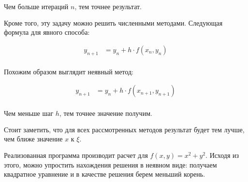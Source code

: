 \documentclass[a4paper,12pt]{article}
\begin{document}
Чем больше итераций $n$, тем точнее результат.

Кроме того, эту задачу можно решить численными методами. Следующая формула
для явного способа:

\[
\begin{aligned}
y_{n+1} &= y_n + h \cdot f(x_n, y_n) \\
\end{aligned}
\]

Похожим образом выглядит неявный метод:

\[
\begin{aligned}
y_{n+1} &= y_n + h \cdot f(x_{n+1}, y_{n+1}) \\
\end{aligned}
\]


Чем меньше шаг $h$, тем точнее значение получим.

Стоит заметить, что для всех рассмотренных методов результат будет тем лучше,
чем ближе значение $x$ к $\xi$.

Реализованная программа производит расчет для $f(x, y) = x^2 + y^2$.
Исходя из этого, можно упростить нахождения решения в неявном виде:
получаем квадратное уравнение и в качестве решения берем меньший
корень.
\end{document}

